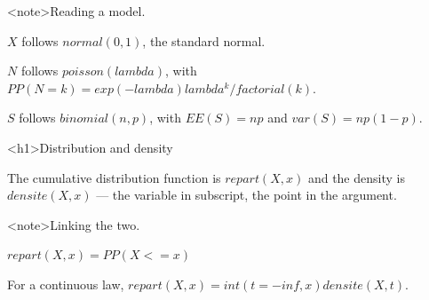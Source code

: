 \documentclass[
  margins=24,
  font=Latin Modern Roman,
  size=12,
  linespread=1.4,
  lang=en
]{scholatex}
\begin{document}
<note>Reading a model.

$X$ follows $normal(0, 1)$, the standard normal.

$N$ follows $poisson(lambda)$, with $PP(N = k) = exp(-lambda) lambda^k / factorial(k)$.

$S$ follows $binomial(n, p)$, with $EE(S) = n p$ and $var(S) = n p (1 - p)$.

<h1>Distribution and density

The cumulative distribution function is $repart(X, x)$ and the density is
$densite(X, x)$ — the variable in subscript, the point in the argument.

<note>Linking the two.

$repart(X, x) = PP(X <= x)$

For a continuous law, $repart(X, x) = int(t=-inf,x) densite(X, t)$.
\end{document}
